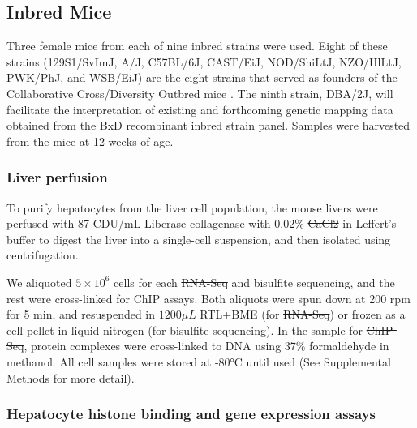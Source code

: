\documentclass[
  11pt,
]{article}
\providecommand{\DIFaddtex}[1]{{\protect\color{blue}\uwave{#1}}} %
\providecommand{\DIFdeltex}[1]{{\protect\color{red}\sout{#1}}}                      %
\providecommand{\DIFaddbegin}{} %
\providecommand{\DIFaddend}{} %
\providecommand{\DIFdelbegin}{} %
\providecommand{\DIFdelend}{} %
\providecommand{\DIFadd}[1]{\texorpdfstring{\DIFaddtex{#1}}{#1}} %
\providecommand{\DIFdel}[1]{\texorpdfstring{\DIFdeltex{#1}}{}} %
\newcommand{\DIFscaledelfig}{0.5}
\newlength{\DIFdelgraphicswidth} %
\newlength{\DIFdelgraphicsheight} %
\newcommand{\DIFaddincludegraphics}[2][]{{\color{blue}\fbox{\DIFOincludegraphics[#1]{#2}}}} %
\newcommand{\DIFdelincludegraphics}[2][]{%
\sbox{\DIFdelgraphicsbox}{\DIFOincludegraphics[#1]{#2}}%
\settoboxwidth{\DIFdelgraphicswidth}{\DIFdelgraphicsbox} %
\settoboxtotalheight{\DIFdelgraphicsheight}{\DIFdelgraphicsbox} %
\scalebox{\DIFscaledelfig}{%
\parbox[b]{\DIFdelgraphicswidth}{\usebox{\DIFdelgraphicsbox}\\[-\baselineskip] \rule{\DIFdelgraphicswidth}{0em}}\llap{\resizebox{\DIFdelgraphicswidth}{\DIFdelgraphicsheight}{%
\setlength{\unitlength}{\DIFdelgraphicswidth}%
\begin{picture}(1,1)%
\thicklines\linethickness{2pt} %
{\color[rgb]{1,0,0}\put(0,0){\framebox(1,1){}}}%
{\color[rgb]{1,0,0}\put(0,0){\line( 1,1){1}}}%
{\color[rgb]{1,0,0}\put(0,1){\line(1,-1){1}}}%
\end{picture}%
}\hspace*{3pt}}} %
} %
\DeclareRobustCommand{\DIFaddbegin}{\DIFOaddbegin \let\includegraphics\DIFaddincludegraphics} %
\DeclareRobustCommand{\DIFaddend}{\DIFOaddend \let\includegraphics\DIFOincludegraphics} %
\DeclareRobustCommand{\DIFdelbegin}{\DIFOdelbegin \let\includegraphics\DIFdelincludegraphics} %
\DeclareRobustCommand{\DIFdelend}{\DIFOaddend \let\includegraphics\DIFOincludegraphics} %
\begin{document}
\hypertarget{inbred-mice}{%
\subsection{Inbred Mice}\label{inbred-mice}}

Three female mice from each of nine inbred strains were used. Eight of
these strains (129S1/SvImJ, A/J, C57BL/6J, CAST/EiJ, NOD/ShiLtJ,
NZO/HlLtJ, PWK/PhJ, and WSB/EiJ) are the eight strains that served as
founders of the Collaborative Cross/Diversity Outbred mice
\citep{Chesler:2008ge}. The ninth strain, DBA/2J, will facilitate the
interpretation of existing and forthcoming genetic mapping data obtained
from the BxD recombinant inbred strain panel. Samples were harvested
from the mice at 12 weeks of age.

\hypertarget{liver-perfusion}{%
\subsubsection{Liver perfusion}\label{liver-perfusion}}

To purify hepatocytes from the liver cell population, the mouse livers
were perfused with 87 CDU/mL Liberase collagenase with 0.02\% \DIFdelbegin \DIFdel{CaCl2 }\DIFdelend \DIFaddbegin \DIFadd{CaCl\(_2\)
}\DIFaddend in Leffert's buffer to digest the liver into a single-cell suspension,
and then isolated using centrifugation.

We aliquoted \(5 \times 10^{6}\) cells for each \DIFdelbegin \DIFdel{RNA-Seq }\DIFdelend \DIFaddbegin \DIFadd{RNA-seq }\DIFaddend and bisulfite
sequencing, and the rest were cross-linked for ChIP assays. Both
aliquots were spun down at 200 rpm for 5 min, and resuspended in
\(1200\mu L\) RTL+BME (for \DIFdelbegin \DIFdel{RNA-Seq}\DIFdelend \DIFaddbegin \DIFadd{RNA-seq}\DIFaddend ) or frozen as a cell pellet in liquid
nitrogen (for bisulfite sequencing). In the sample for \DIFdelbegin \DIFdel{ChIP-Seq}\DIFdelend \DIFaddbegin \DIFadd{ChIP-seq}\DIFaddend , protein
complexes were cross-linked to DNA using 37\% formaldehyde in methanol.
All cell samples were stored at -80°C until used (See Supplemental
Methods for more detail).

\hypertarget{hepatocyte-histone-binding-and-gene-expression-assays}{%
\subsubsection{Hepatocyte histone binding and gene expression
assays}\label{hepatocyte-histone-binding-and-gene-expression-assays}}
\end{document}
